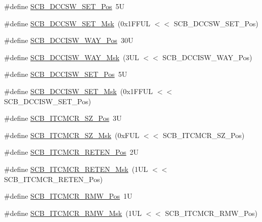 \begin{DoxyCompactItemize}
\#define \hyperlink{group___c_m_s_i_s___s_c_b_gae93985adc38a127bc8dc909ac58e8fea}{S\+C\+B\+\_\+\+D\+C\+C\+S\+W\+\_\+\+S\+E\+T\+\_\+\+Pos}~5U
\item 
\#define \hyperlink{group___c_m_s_i_s___s_c_b_ga669e16d98c8ea0e66afb04641971d98c}{S\+C\+B\+\_\+\+D\+C\+C\+S\+W\+\_\+\+S\+E\+T\+\_\+\+Msk}~(0x1\+F\+F\+U\+L $<$$<$ S\+C\+B\+\_\+\+D\+C\+C\+S\+W\+\_\+\+S\+E\+T\+\_\+\+Pos)
\item 
\#define \hyperlink{group___c_m_s_i_s___s_c_b_gaa90bd0b36679219d6a2144eba6eb96cd}{S\+C\+B\+\_\+\+D\+C\+C\+I\+S\+W\+\_\+\+W\+A\+Y\+\_\+\+Pos}~30U
\item 
\#define \hyperlink{group___c_m_s_i_s___s_c_b_gaf2269bbe0bc7705e1da8f5ee0f581054}{S\+C\+B\+\_\+\+D\+C\+C\+I\+S\+W\+\_\+\+W\+A\+Y\+\_\+\+Msk}~(3\+U\+L $<$$<$ S\+C\+B\+\_\+\+D\+C\+C\+I\+S\+W\+\_\+\+W\+A\+Y\+\_\+\+Pos)
\item 
\#define \hyperlink{group___c_m_s_i_s___s_c_b_ga525f1bb9849e89b3eafbd53dcd51e296}{S\+C\+B\+\_\+\+D\+C\+C\+I\+S\+W\+\_\+\+S\+E\+T\+\_\+\+Pos}~5U
\item 
\#define \hyperlink{group___c_m_s_i_s___s_c_b_gaf1b0bea5ab77d4ad7d5c21e77ca463ad}{S\+C\+B\+\_\+\+D\+C\+C\+I\+S\+W\+\_\+\+S\+E\+T\+\_\+\+Msk}~(0x1\+F\+F\+U\+L $<$$<$ S\+C\+B\+\_\+\+D\+C\+C\+I\+S\+W\+\_\+\+S\+E\+T\+\_\+\+Pos)
\item 
\#define \hyperlink{group___c_m_s_i_s___s_c_b_ga86b58242b8286aba9318e2062d88f341}{S\+C\+B\+\_\+\+I\+T\+C\+M\+C\+R\+\_\+\+S\+Z\+\_\+\+Pos}~3U
\item 
\#define \hyperlink{group___c_m_s_i_s___s_c_b_ga2aca0f00fd91071567dfa596eaa136de}{S\+C\+B\+\_\+\+I\+T\+C\+M\+C\+R\+\_\+\+S\+Z\+\_\+\+Msk}~(0x\+F\+U\+L $<$$<$ S\+C\+B\+\_\+\+I\+T\+C\+M\+C\+R\+\_\+\+S\+Z\+\_\+\+Pos)
\item 
\#define \hyperlink{group___c_m_s_i_s___s_c_b_ga1094e5655c0e9572ecd562fa4a7d5f21}{S\+C\+B\+\_\+\+I\+T\+C\+M\+C\+R\+\_\+\+R\+E\+T\+E\+N\+\_\+\+Pos}~2U
\item 
\#define \hyperlink{group___c_m_s_i_s___s_c_b_ga6f7d14ca4c78b7fd64157d9f8110f188}{S\+C\+B\+\_\+\+I\+T\+C\+M\+C\+R\+\_\+\+R\+E\+T\+E\+N\+\_\+\+Msk}~(1\+U\+L $<$$<$ S\+C\+B\+\_\+\+I\+T\+C\+M\+C\+R\+\_\+\+R\+E\+T\+E\+N\+\_\+\+Pos)
\item 
\#define \hyperlink{group___c_m_s_i_s___s_c_b_ga33901f7f35fe403c82a9641a0d35ae92}{S\+C\+B\+\_\+\+I\+T\+C\+M\+C\+R\+\_\+\+R\+M\+W\+\_\+\+Pos}~1U
\item 
\#define \hyperlink{group___c_m_s_i_s___s_c_b_ga0e3b9b0855837e95e4b0fc6d36cd604b}{S\+C\+B\+\_\+\+I\+T\+C\+M\+C\+R\+\_\+\+R\+M\+W\+\_\+\+Msk}~(1\+U\+L $<$$<$ S\+C\+B\+\_\+\+I\+T\+C\+M\+C\+R\+\_\+\+R\+M\+W\+\_\+\+Pos)

\end{DoxyCompactItemize}
